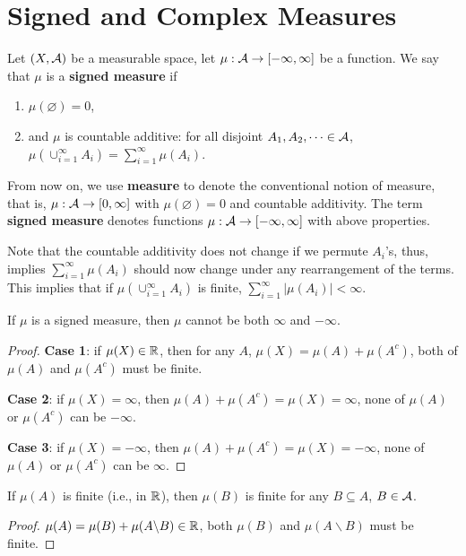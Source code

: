\documentclass[11pt]{article}
\begin{document}
	\newpage
	\section{Signed and Complex Measures}
	\begin{definition}
		Let $(X, \mathcal{{A}})$ be a measurable space, let $\mu: \mathcal{{A}} \to [-\infty, \infty]$ be a function. We say that $\mu$ is a \textbf{signed measure} if
		\begin{enumerate}
			\item $\mu(\varnothing) = 0$,
			\item and $\mu$ is countable additive: for all disjoint $A_1, A_2, \dots \in \mathcal{{A}}$, $\mu(\cup_{i=1}^\infty A_i) = \sum_{i=1}^\infty \mu(A_i)$.
		\end{enumerate}
	\end{definition}
	From now on, we use \textbf{measure} to denote the conventional notion of measure, that is, $\mu: \mathcal{{A}} \to [0, \infty]$ with $\mu(\varnothing) = 0$ and countable additivity. The term \textbf{signed measure} denotes functions $\mu: \mathcal{{A}} \to [-\infty, \infty]$ with above properties.
	\begin{remark}
		Note that the countable additivity does not change if we permute $A_i$'s, thus, implies $\sum_{i=1}^\infty \mu(A_i)$ should now change under any rearrangement of the terms. This implies that if $\mu(\cup_{i=1}^\infty A_i)$ is finite, $\sum_{i=1}^\infty |\mu(A_i)| < \infty$.
	\end{remark}
	
	\begin{proposition}
		If $\mu$ is a signed measure, then $\mu$ cannot be both $\infty$ and $-\infty$.
		\begin{proof}
			\textbf{Case 1}: if $\mu(X) \in \mathbb{R}$, then for any $A$, $\mu(X) = \mu(A) + \mu(A^c)$, both of $\mu(A)$ and $\mu(A^c)$ must be finite. 
			
			\textbf{Case 2}: if $\mu(X) = \infty$, then $\mu(A) + \mu(A^c) = \mu(X) = \infty$, none of $\mu(A)$ or $\mu(A^c)$ can be $-\infty$.
			
			\textbf{Case 3}: if $\mu(X) = - \infty$, then $\mu(A) + \mu(A^c) = \mu(X) = - \infty$, none of $\mu(A)$ or $\mu(A^c)$ can be $\infty$. 
		\end{proof}
	\end{proposition}
	
	\begin{proposition}
		If $\mu(A)$ is finite (i.e., in $\mathbb{R}$), then $\mu(B)$ is finite for any $B \subseteq A$, $B \in \mathcal{{A}}$.
		\begin{proof}
			$\mu(A) = \mu(B) + \mu(A \backslash B) \in \mathbb{R}$, both $\mu(B)$ and $\mu(A \backslash B)$ must be finite.
		\end{proof}
	\end{proposition}
\end{document}
